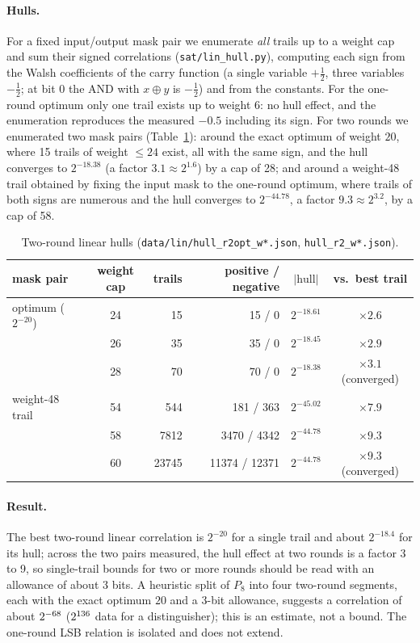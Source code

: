 \documentclass{iacrtrans}
\newcommand{\PP}[1]{P_{#1}}
\newcommand{\WlinTwo}{20}    %
\begin{document}
\paragraph{Hulls.} For a fixed input/output mask pair we enumerate \emph{all} trails up to a weight cap and sum their signed correlations (\texttt{sat/lin\_hull.py}), computing each sign from the Walsh coefficients of the carry function (a single variable $+\tfrac12$, three variables $-\tfrac12$; at bit 0 the AND with $x\oplus y$ is $-\tfrac12$) and from the constants. For the one-round optimum only one trail exists up to weight 6: no hull effect, and the enumeration reproduces the measured $-0.5$ including its sign. For two rounds we enumerated two mask pairs (Table~\ref{tab:hull}): around the exact optimum of weight $\WlinTwo$, where 15 trails of weight $\leq 24$ exist, all with the same sign, and the hull converges to $2^{-18.38}$ (a factor $3.1 \approx 2^{1.6}$) by a cap of 28; and around a weight-48 trail obtained by fixing the input mask to the one-round optimum, where trails of both signs are numerous and the hull converges to $2^{-44.78}$, a factor $9.3 \approx 2^{3.2}$, by a cap of 58.

\begin{table}[htb]
\centering
\caption{Two-round linear hulls (\texttt{data/lin/hull\_r2opt\_w*.json}, \texttt{hull\_r2\_w*.json}).}
\label{tab:hull}
\small
\begin{tabular}{lcrrcc}
\toprule
mask pair & weight cap & trails & positive / negative & $|\text{hull}|$ & vs.\ best trail\\
\midrule
optimum ($2^{-\WlinTwo}$) & 24 & 15 & 15 / 0 & $2^{-18.61}$ & $\times 2.6$\\
 & 26 & 35 & 35 / 0 & $2^{-18.45}$ & $\times 2.9$\\
 & 28 & 70 & 70 / 0 & $2^{-18.38}$ & $\times 3.1$ (converged)\\
\midrule
weight-48 trail & 54 & 544 & 181 / 363 & $2^{-45.02}$ & $\times 7.9$\\
 & 58 & 7812 & 3470 / 4342 & $2^{-44.78}$ & $\times 9.3$\\
 & 60 & 23745 & 11374 / 12371 & $2^{-44.78}$ & $\times 9.3$ (converged)\\
\bottomrule
\end{tabular}
\end{table}

\paragraph{Result.} The best two-round linear correlation is $2^{-\WlinTwo}$ for a single trail and about $2^{-18.4}$ for its hull; across the two pairs measured, the hull effect at two rounds is a factor 3 to 9, so single-trail bounds for two or more rounds should be read with an allowance of about 3 bits. A heuristic split of $\PP{8}$ into four two-round segments, each with the exact optimum $\WlinTwo$ and a 3-bit allowance, suggests a correlation of about $2^{-\the\numexpr 4*(\WlinTwo-3)\relax}$ ($2^{\the\numexpr 8*(\WlinTwo-3)\relax}$ data for a distinguisher); this is an estimate, not a bound. The one-round LSB relation is isolated and does not extend.
\end{document}
